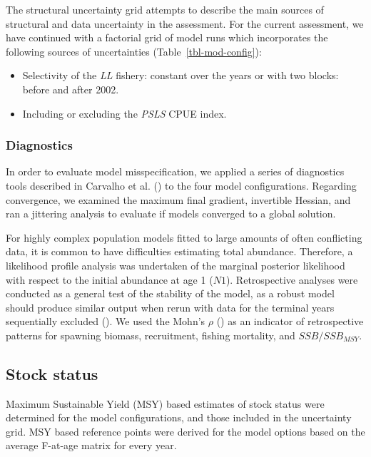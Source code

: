 \documentclass[
]{scrartcl}
\providecommand{\tightlist}{%
  \setlength{\itemsep}{0pt}\setlength{\parskip}{0pt}}
\begin{document}
The structural uncertainty grid attempts to describe the main sources of
structural and data uncertainty in the assessment. For the current
assessment, we have continued with a factorial grid of model runs which
incorporates the following sources of uncertainties
(Table~\ref{tbl-mod-config}):

\begin{itemize}
\tightlist
\item
  Selectivity of the \emph{LL} fishery: constant over the years or with
  two blocks: before and after 2002.
\item
  Including or excluding the \emph{PSLS} CPUE index.
\end{itemize}

\subsubsection{Diagnostics}\label{diagnostics}

In order to evaluate model misspecification, we applied a series of
diagnostics tools described in Carvalho et al.
() to the four model
configurations. Regarding convergence, we examined the maximum final
gradient, invertible Hessian, and ran a jittering analysis to evaluate
if models converged to a global solution.

For highly complex population models fitted to large amounts of often
conflicting data, it is common to have difficulties estimating total
abundance. Therefore, a likelihood profile analysis was undertaken of
the marginal posterior likelihood with respect to the initial abundance
at age 1 (\(N1\)). Retrospective analyses were conducted as a general
test of the stability of the model, as a robust model should produce
similar output when rerun with data for the terminal years sequentially
excluded (). We used the Mohn's \(\rho\)
() as
an indicator of retrospective patterns for spawning biomass,
recruitment, fishing mortality, and \(SSB/SSB_{MSY}\).

\subsection{Stock status}\label{stock-status}

Maximum Sustainable Yield (MSY) based estimates of stock status were
determined for the model configurations, and those included in the
uncertainty grid. MSY based reference points were derived for the model
options based on the average F-at-age matrix for every year.
\end{document}
